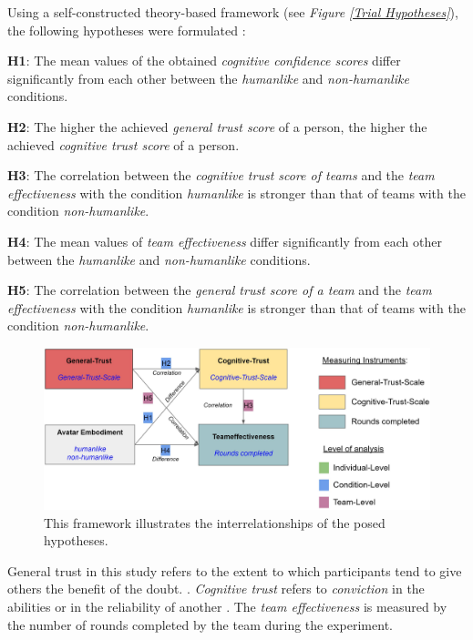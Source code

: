 \documentclass[sigchi]{acmart}
\begin{document}
Using a self-constructed theory-based framework (see \textit{Figure \ref{Trial Hypotheses}}), the following hypotheses were formulated :

\textbf{H1}: The mean values of the obtained \textit{cognitive confidence scores} differ significantly from each other between the \textit{humanlike} and \textit{non-humanlike} conditions.

\textbf{H2}: The higher the achieved \textit{general trust score} of a person, the higher the achieved \textit{cognitive trust score} of a person.

\textbf{H3}: The correlation between the \textit{cognitive trust score of teams} and the \textit{team effectiveness} with the condition \textit{humanlike} is stronger than that of teams with the condition \textit{non-humanlike}.

\textbf{H4}: The mean values of \textit{team effectiveness} differ significantly from each other between the \textit{humanlike} and \textit{non-humanlike} conditions.

\textbf{H5}: The correlation between the \textit{general trust score of a team} and the \textit{team effectiveness} with the condition \textit{humanlike} is stronger than that of teams with the condition \textit{non-humanlike}.

\begin{figure}[H]
		\begin{footnotesize}
			\includegraphics[width=\linewidth]{Abbildungen/Versuchshypothesen_02.JPG}		
			\caption[The self-constructed framework of experimental hypotheses]{This framework illustrates the interrelationships of the posed hypotheses.}
			\label{Versuchshypothesen}
		\end{footnotesize}
	\end{figure}	

General trust in this study refers to the extent to which participants tend to give others the benefit of the doubt. \citep[S. 30]{mcallister1995affect}.
\textit{Cognitive trust} refers to \textit{conviction} in the abilities or in the reliability of another \citep[S. 30]{mcallister1995affect}.
The \textit{team effectiveness} is measured by the number of rounds completed by the team during the experiment.
\end{document}
